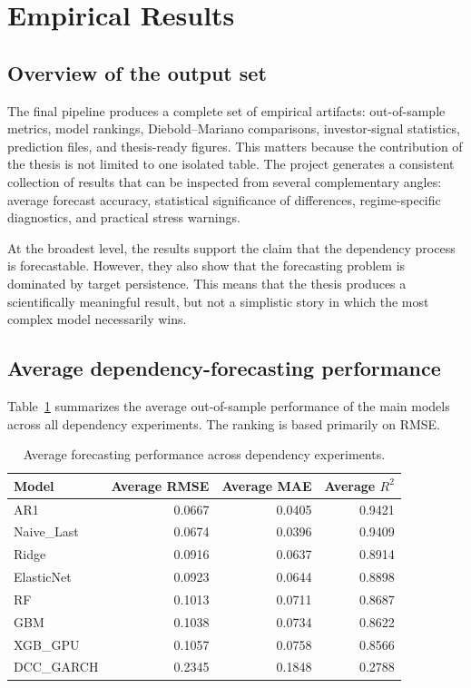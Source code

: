 ﻿\section{Empirical Results}

\subsection{Overview of the output set}

The final pipeline produces a complete set of empirical artifacts: out-of-sample metrics, model rankings, Diebold--Mariano comparisons, investor-signal statistics, prediction files, and thesis-ready figures. This matters because the contribution of the thesis is not limited to one isolated table. The project generates a consistent collection of results that can be inspected from several complementary angles: average forecast accuracy, statistical significance of differences, regime-specific diagnostics, and practical stress warnings.

At the broadest level, the results support the claim that the dependency process is forecastable. However, they also show that the forecasting problem is dominated by target persistence. This means that the thesis produces a scientifically meaningful result, but not a simplistic story in which the most complex model necessarily wins.

\subsection{Average dependency-forecasting performance}

Table~\ref{tab:model_ranking_summary} summarizes the average out-of-sample performance of the main models across all dependency experiments. The ranking is based primarily on RMSE.

\begin{table}[H]
    \centering
    \caption{Average forecasting performance across dependency experiments.}
    \label{tab:model_ranking_summary}
    \begin{tabular}{lrrr}
        \toprule
        Model & Average RMSE & Average MAE & Average $R^2$ \\
        \midrule
        AR1 & 0.0667 & 0.0405 & 0.9421 \\
        Naive\_Last & 0.0674 & 0.0396 & 0.9409 \\
        Ridge & 0.0916 & 0.0637 & 0.8914 \\
        ElasticNet & 0.0923 & 0.0644 & 0.8898 \\
        RF & 0.1013 & 0.0711 & 0.8687 \\
        GBM & 0.1038 & 0.0734 & 0.8622 \\
        XGB\_GPU & 0.1057 & 0.0758 & 0.8566 \\
        DCC\_GARCH & 0.2345 & 0.1848 & 0.2788 \\
        \bottomrule
    \end{tabular}
\end{table}

